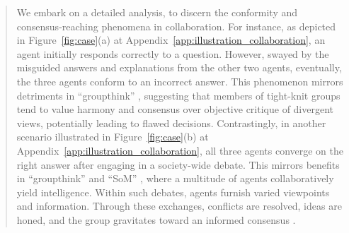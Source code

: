 \documentclass[11pt]{article}
\begin{document}
\begin{abstract}


We embark on a detailed analysis, to discern the conformity and consensus-reaching phenomena in collaboration. 
For instance, as depicted in Figure~\ref{fig:case}(a) at Appendix~\ref{app:illustration_collaboration}, an agent initially responds correctly to a question. However, swayed by the misguided answers and explanations from the other two agents, eventually, the three agents conform to an incorrect answer. 
This phenomenon mirrors detriments in ``groupthink'' \citep{Book1972_Groupthink,J1995_IntragroupConflict}, suggesting that members of tight-knit groups tend to value harmony and consensus over objective critique of divergent views, potentially leading to flawed decisions. 
Contrastingly, in another scenario illustrated in Figure~\ref{fig:case}(b) at Appendix~\ref{app:illustration_collaboration}, all three agents converge on the right answer after engaging in a society-wide debate. 
This mirrors benefits in ``groupthink'' \citep{J1995_IntragroupConflict} and ``SoM'' \citep{Book1988_SoM,J2003_SoM}, where a multitude of agents collaboratively yield intelligence. Within such debates, agents furnish varied viewpoints and information. Through these exchanges, conflicts are resolved, ideas are honed, and the group gravitates toward an informed consensus \citep{Book2011_Negotiation,Book2018_GroupDynamics}. 


\end{abstract}
\end{document}
